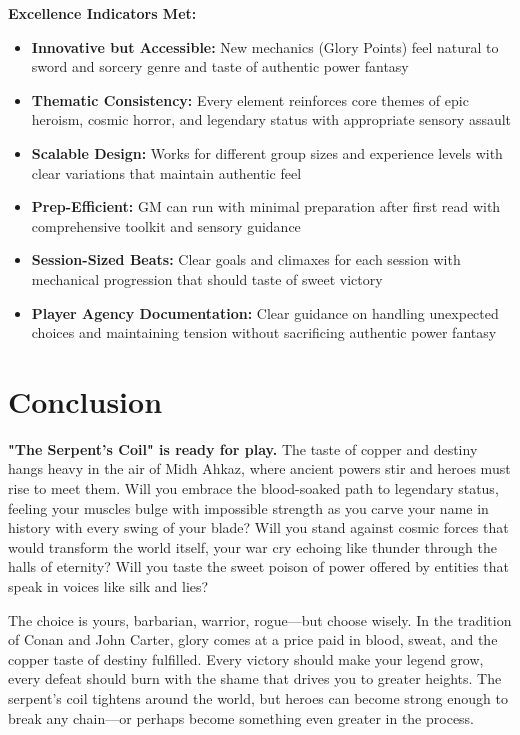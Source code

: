 \documentclass[11pt]{article}
\begin{document}
\begin{itemize}
\begin{itemize}
\begin{itemize}
\textbf{Excellence Indicators Met:}
\begin{itemize}
\item \checkmark \textbf{Innovative but Accessible:} New mechanics (Glory Points) feel natural to sword and sorcery genre and taste of authentic power fantasy
\item \checkmark \textbf{Thematic Consistency:} Every element reinforces core themes of epic heroism, cosmic horror, and legendary status with appropriate sensory assault
\item \checkmark \textbf{Scalable Design:} Works for different group sizes and experience levels with clear variations that maintain authentic feel
\item \checkmark \textbf{Prep-Efficient:} GM can run with minimal preparation after first read with comprehensive toolkit and sensory guidance
\item \checkmark \textbf{Session-Sized Beats:} Clear goals and climaxes for each session with mechanical progression that should taste of sweet victory
\item \checkmark \textbf{Player Agency Documentation:} Clear guidance on handling unexpected choices and maintaining tension without sacrificing authentic power fantasy
\end{itemize}

\section*{Conclusion}

\textbf{"The Serpent's Coil" is ready for play.} The taste of copper and destiny hangs heavy in the air of Midh Ahkaz, where ancient powers stir and heroes must rise to meet them. Will you embrace the blood-soaked path to legendary status, feeling your muscles bulge with impossible strength as you carve your name in history with every swing of your blade? Will you stand against cosmic forces that would transform the world itself, your war cry echoing like thunder through the halls of eternity? Will you taste the sweet poison of power offered by entities that speak in voices like silk and lies?

The choice is yours, barbarian, warrior, rogue—but choose wisely. In the tradition of Conan and John Carter, glory comes at a price paid in blood, sweat, and the copper taste of destiny fulfilled. Every victory should make your legend grow, every defeat should burn with the shame that drives you to greater heights. The serpent's coil tightens around the world, but heroes can become strong enough to break any chain—or perhaps become something even greater in the process.


\end{itemize}
\end{itemize}
\end{itemize}
\end{document}
